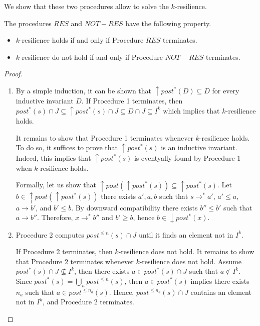 We show that these two procedures allow to solve the $k$-resilience.

\begin{proposition}
The procedures $RES$ and $NOT-RES$ have the following property.
\begin{itemize}
%
\item $k$-resilience holds if and only if Procedure $RES$ terminates.
%
\item $k$-resilience do not hold if and only if Procedure $NOT-RES$ terminates.
%
\end{itemize}
\end{proposition}


\begin{proof}

\begin{enumerate}

\item By a simple induction, it can be shown that $\uparrow post^*(D) \subseteq D$ for every inductive invariant $D$. 
If Procedure 1 terminates, then
$post^*(s) \cap J \subseteq \uparrow post^*(s) \cap J \subseteq D  \cap J \subseteq I^k$
which implies that $k$-resilience holds.

It remains to show that Procedure 1 terminates whenever $k$-resilience holds. To do so, it suffices to prove that $\uparrow post^*(s)$ is an inductive invariant. Indeed, this implies that
$\uparrow post^*(s)$ is eventyally found by Procedure 1 when $k$-resilience holds. 

Formally, let us show that $\uparrow post(\uparrow post^*(s)) \subseteq \uparrow post^*(s)$.
Let $b \in \uparrow post(\uparrow post^*(s))$ 
there exists $a', a, b$ such that
$s \rightarrow^* a'$,
$a' \leq a$,
$a \rightarrow b'$,
and
$b' \leq b$.
By downward compatibility 
there exists $b'' \leq b'$ such that $a \rightarrow b'' $. Therefore, $x \rightarrow^* b''$ and $b' \geq b$, hence $b \in \downarrow post^*(x)$.
\item Procedure 2 computes
 $post^{\leq n}(s) \cap J$
 until it finds an element not in $ I^k$.

If Procedure 2 terminates, then
$k$-resilience does not hold.
It remains to show that Procedure 2 terminates whenever $k$-resilience does not hold.
Assume $ post^*(s) \cap J \not\subseteq I^k$, then there exists $a \in post^*(s) \cap J$ such that $a \not\in I^k$. Since $post^*(s) = \bigcup_{n} post^{\leq n}(s)$, then 
$a \in post^*(s)$
implies
there exists
$n_a$
such that
$a \in post^{\leq n_a}(s)$.
Hence,  $post^{\leq n_a}(s) \cap J$ contains an element not in 
$I^k$,
and Procedure 2 terminates.
\end{enumerate}

\end{proof}



